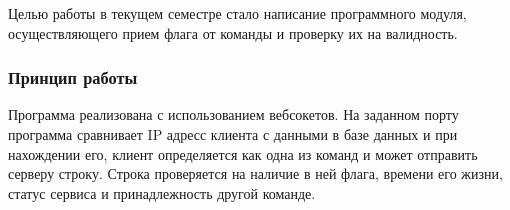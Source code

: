 Целью работы в текущем семестре стало написание программного модуля, осуществляющего прием флага от команды и проверку их на валидность.

\subsubsection{Принцип работы}

Программа реализована с использованием вебсокетов. На заданном порту программа сравнивает IP адресс клиента с данными в базе данных и при нахождении его, клиент определяется как одна из команд и может отправить серверу строку. Строка проверяется на наличие в ней флага, времени его жизни, статус сервиса и принадлежность другой команде.

\clearpage